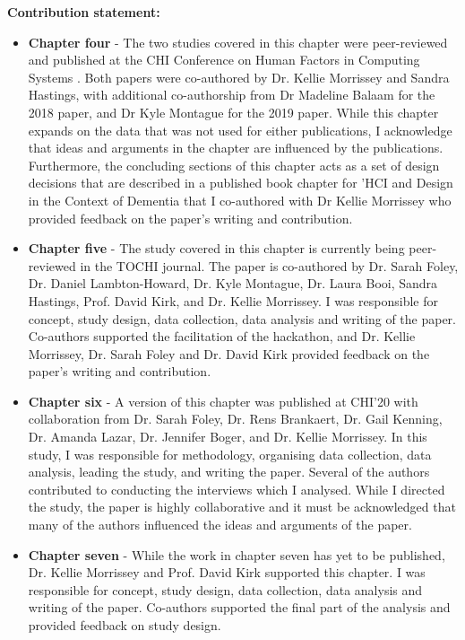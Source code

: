 \textbf{Contribution statement:} 
\begin{itemize}
    \item \textbf{Chapter four} - The two studies covered in this chapter were peer-reviewed and published at the CHI Conference on Human Factors in Computing Systems \citep{hodge_exploring_2018,hodge_exploring_2019}. Both papers were co-authored by Dr. Kellie Morrissey and Sandra Hastings, with additional co-authorship from Dr Madeline Balaam for the 2018 paper, and Dr Kyle Montague for the 2019 paper. While this chapter expands on the data that was not used for either publications, I acknowledge that ideas and arguments in the chapter are influenced by the publications. Furthermore, the concluding sections of this chapter acts as a set of design decisions that are described in a published book chapter for 'HCI and Design in the Context of Dementia \citep{hodge2020sharing} that I co-authored with Dr Kellie Morrissey who provided feedback on the paper's writing and contribution. 

    \item \textbf{Chapter five} - The study covered in this chapter is currently being peer-reviewed in the TOCHI journal. The paper is co-authored by Dr. Sarah Foley, Dr. Daniel Lambton-Howard, Dr. Kyle Montague, Dr. Laura Booi, Sandra Hastings, Prof. David Kirk, and Dr. Kellie Morrissey. I was responsible for concept, study design, data collection, data analysis and writing of the paper. Co-authors supported the facilitation of the hackathon, and Dr. Kellie Morrissey, Dr. Sarah Foley and Dr. David Kirk provided feedback on the paper's writing and contribution.
    
    \item \textbf{Chapter six} - A version of this chapter was published at CHI'20 \citep{hodge_relational_2020} with collaboration from  Dr. Sarah Foley, Dr. Rens Brankaert, Dr. Gail Kenning, Dr. Amanda Lazar, Dr. Jennifer Boger, and Dr. Kellie Morrissey. In this study, I was responsible for methodology, organising data collection, data analysis, leading the study, and writing the paper. Several of the authors contributed to conducting the interviews which I analysed. While I directed the study, the paper is highly collaborative and it must be acknowledged that many of the authors influenced the ideas and arguments of the paper.

    \item \textbf{Chapter seven} - While the work in chapter seven has yet to be published, Dr. Kellie Morrissey and Prof. David Kirk supported this chapter. I was responsible for concept, study design, data collection, data analysis and writing of the paper. Co-authors supported the final part of the analysis and provided feedback on study design.
\end{itemize}
